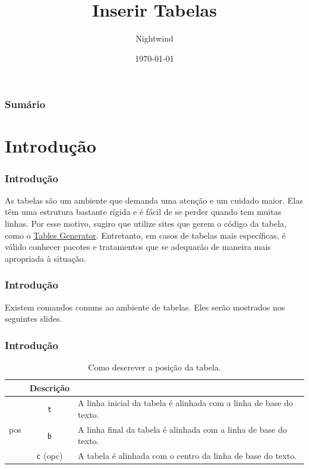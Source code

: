 \documentclass[brazilian]{beamer}
\title{Inserir Tabelas}
\author{Nightwind}
\institute[CTISM]{Colégio Técnico Industrial de Santa Maria}
\date{\today}
\begin{document}
\frame{\titlepage}

\begin{frame}
  \frametitle{Sumário}
  \tableofcontents
\end{frame}

\section{Introdução}
\begin{frame}
  \frametitle{Introdução}

  As tabelas são um ambiente que demanda uma atenção e um cuidado maior. Elas têm uma estrutura bastante rígida e é fácil de se perder quando tem muitas linhas. Por esse motivo, sugiro que utilize sites que gerem o código da tabela, como o \href{https://www.tablesgenerator.com/}{Tables Generator}. Entretanto, em casos de tabelas mais específicas, é válido conhecer pacotes e tratamentos que se adequarão de maneira mais apropriada à situação.

\end{frame}

\begin{frame}
  \frametitle{Introdução}

  Existem comandos comuns ao ambiente de tabelas. Eles serão mostrados nos seguintes slides.

\end{frame}

\begin{frame}[fragile]
  \frametitle{Introdução}


  \begin{table}
    \caption{Como descrever a posição da tabela.}
    \label{tab:Posicao}
    \begin{tabular}[c]{c|c|m{8cm}}
      \firsthline
      \multicolumn{2}{c}{Comando} & Descrição                                                                             \\ \hline
      \multirow{3}{*}{pos}        & \texttt{t}       & A linha inicial da tabela é alinhada com a linha de base do texto. \\ \cline{2-3}
                                  & \texttt{b}       & A linha final da tabela é alinhada com a linha de base do texto.   \\ \cline{2-3}
                                  & \texttt{c} (opc) & A tabela é alinhada com  o centro da linha de base do texto.       \\ \hline
    \end{tabular}
  \end{table}

\end{frame}
\end{document}
